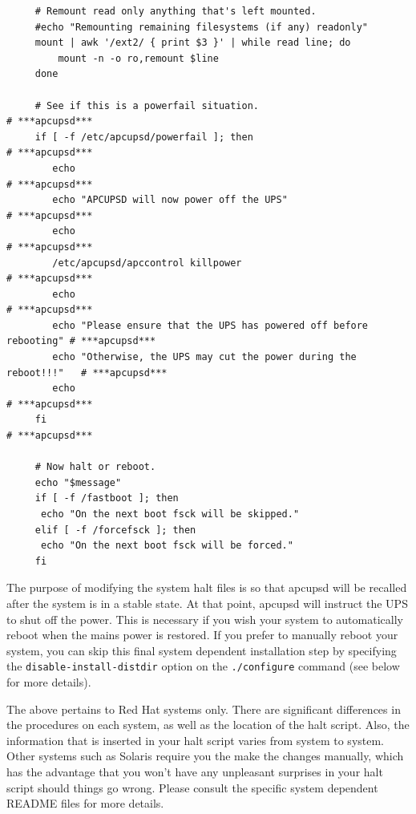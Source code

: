 \footnotesize
\begin{verbatim}
     # Remount read only anything that's left mounted.
     #echo "Remounting remaining filesystems (if any) readonly"
     mount | awk '/ext2/ { print $3 }' | while read line; do
         mount -n -o ro,remount $line
     done
     
     # See if this is a powerfail situation.                               # ***apcupsd***
     if [ -f /etc/apcupsd/powerfail ]; then                                # ***apcupsd***
        echo                                                               # ***apcupsd***
        echo "APCUPSD will now power off the UPS"                          # ***apcupsd***
        echo                                                               # ***apcupsd***
        /etc/apcupsd/apccontrol killpower                                  # ***apcupsd***
        echo                                                               # ***apcupsd***
        echo "Please ensure that the UPS has powered off before rebooting" # ***apcupsd***
        echo "Otherwise, the UPS may cut the power during the reboot!!!"   # ***apcupsd***
        echo                                                               # ***apcupsd***
     fi                                                                    # ***apcupsd***
     
     # Now halt or reboot.
     echo "$message"
     if [ -f /fastboot ]; then
      echo "On the next boot fsck will be skipped."
     elif [ -f /forcefsck ]; then
      echo "On the next boot fsck will be forced."
     fi
\end{verbatim}
\normalsize

The purpose of modifying the system halt files is so that apcupsd will be
recalled after the system is in a stable state. At that point, apcupsd will
instruct the UPS to shut off the power. This is necessary if you wish your
system to automatically reboot when the mains power is restored. If you prefer
to manually reboot your system, you can skip this final system dependent
installation step by specifying the {\tt disable-install-distdir} option on
the {\tt ./configure} command (see below for more details).  

The above pertains to Red Hat systems only. There are significant differences
in the procedures on each system, as well as the location of the halt script.
Also, the information that is inserted in your halt script varies from system
to system. Other systems such as Solaris require you the make the changes
manually, which has the advantage that you won't have any unpleasant surprises
in your halt script should things go wrong. Please consult the specific system
dependent README files for more details.  

